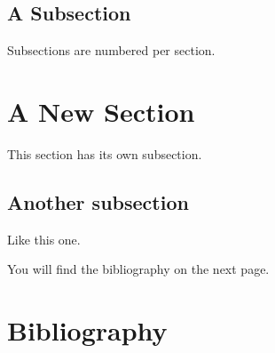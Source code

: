\documentclass{SMR}
\begin{document}
\pagebreak

\subsection{A Subsection} %

Subsections are numbered per section.

\section{A New Section}

This section has its own subsection.

\subsection{Another subsection}

Like this one.

You will find the bibliography on the next page.
\vfill\pagebreak


\section*{Bibliography}
\end{document}
